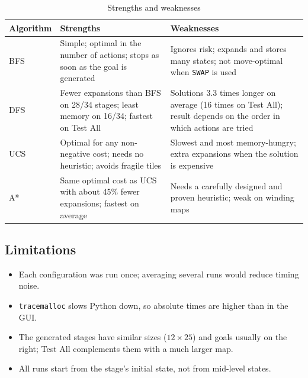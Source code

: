 \begin{table}[H]
\centering
\caption{Strengths and weaknesses}
\label{tab:proscons}
\begin{tabularx}{\linewidth}{lXX}
\toprule
\textbf{Algorithm} & \textbf{Strengths} & \textbf{Weaknesses} \\
\midrule
BFS & Simple; optimal in the number of actions; stops as soon as the goal is generated & Ignores risk; expands and stores many states; not move-optimal when \texttt{SWAP} is used \\
DFS & Fewer expansions than BFS on 28/34 stages; least memory on 16/34; fastest on Test All & Solutions 3.3 times longer on average (16 times on Test All); result depends on the order in which actions are tried \\
UCS & Optimal for any non-negative cost; needs no heuristic; avoids fragile tiles & Slowest and most memory-hungry; extra expansions when the solution is expensive \\
A* & Same optimal cost as UCS with about 45\% fewer expansions; fastest on average & Needs a carefully designed and proven heuristic; weak on winding maps \\
\bottomrule
\end{tabularx}
\end{table}

\subsection{Limitations}

\begin{itemize}[leftmargin=*]
\item Each configuration was run once; averaging several runs would reduce timing noise.
\item \texttt{tracemalloc} slows Python down, so absolute times are higher than in the GUI.
\item The generated stages have similar sizes ($12\times25$) and goals usually on the right; Test All
complements them with a much larger map.
\item All runs start from the stage's initial state, not from mid-level states.
\end{itemize}
